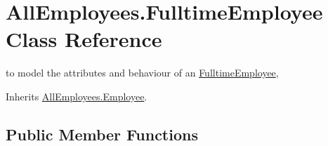 \hypertarget{class_all_employees_1_1_fulltime_employee}{\section{All\-Employees.\-Fulltime\-Employee Class Reference}
\label{class_all_employees_1_1_fulltime_employee}
}


to model the attributes and behaviour of an \hyperlink{class_all_employees_1_1_fulltime_employee}{Fulltime\-Employee},  




Inherits \hyperlink{class_all_employees_1_1_employee}{All\-Employees.\-Employee}.

\subsection*{Public Member Functions}
